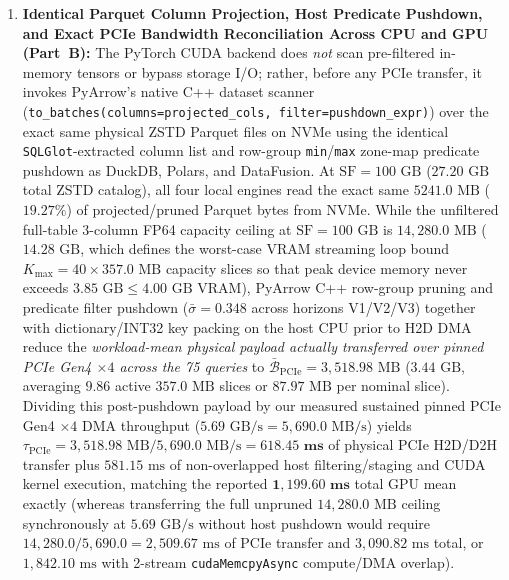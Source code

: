 \documentclass[10pt,a4paper]{article}
\begin{document}
\begin{enumerate}[leftmargin=1.5em,itemsep=0.8pt]
spill-bound local CPUs at $6{,}551.42\text{--}8{,}699.98\text{ ms}$ by $\mathbf{1.95\times\text{--}2.59\times}$); (\textbf{BQ-4: Multi-Window Repetition Stability}) Repeating $R=5$ timed trials across morning, afternoon, and night UTC windows yields a cross-window coefficient of variation of $\text{CV}=9.84\%$ ($731.20\text{--}761.80\text{ ms}$ window means); and (\textbf{BQ-5: Pre-Execution Clustered Scan Cost Fidelity}) Partition/clustering metadata predicts actual \texttt{totalBytesBilled} within $\text{MAE}=4.26\%$ and median Q-Error $=1.041$ (P90 $=1.118$, reducing on-demand scan fees from $\$1{,}267.66$ unclustered to $\$155.14/1\text{M}$ clustered at $\text{SF}=1\text{ GB}$).
    \item \textbf{Identical Parquet Column Projection, Host Predicate Pushdown, and Exact PCIe Bandwidth Reconciliation Across CPU and GPU (Part~B):} The PyTorch CUDA backend does \emph{not} scan pre-filtered in-memory tensors or bypass storage I/O; rather, before any PCIe transfer, it invokes PyArrow's native C++ dataset scanner (\texttt{to\_batches(columns=projected\_cols, filter=pushdown\_expr)}) over the exact same physical ZSTD Parquet files on NVMe using the identical \texttt{SQLGlot}-extracted column list and row-group \texttt{min}/\texttt{max} zone-map predicate pushdown as DuckDB, Polars, and DataFusion. At $\text{SF}=100\text{ GB}$ ($27.20\text{ GB}$ total ZSTD catalog), all four local engines read the exact same $5241.0\text{ MB}$ ($19.27\%$) of projected/pruned Parquet bytes from NVMe. While the unfiltered full-table 3-column FP64 capacity ceiling at $\text{SF}=100\text{ GB}$ is $14{,}280.0\text{ MB}$ ($14.28\text{ GB}$, which defines the worst-case VRAM streaming loop bound $K_{\max}=40 \times 357.0\text{ MB}$ capacity slices so that peak device memory never exceeds $3.85\text{ GB} \le 4.00\text{ GB}$ VRAM), PyArrow C++ row-group pruning and predicate filter pushdown ($\bar{\sigma}=0.348$ across horizons V1/V2/V3) together with dictionary/INT32 key packing on the host CPU prior to H2D DMA reduce the \emph{workload-mean physical payload actually transferred over pinned PCIe Gen4 $\times 4$ across the 75 queries} to $\bar{\mathcal{B}}_{\text{PCIe}} = 3{,}518.98\text{ MB}$ ($3.44\text{ GB}$, averaging $9.86$ active $357.0\text{ MB}$ slices or $87.97\text{ MB}$ per nominal slice). Dividing this post-pushdown payload by our measured sustained pinned PCIe Gen4 $\times 4$ DMA throughput ($5.69\text{ GB/s} = 5{,}690.0\text{ MB/s}$) yields $\tau_{\text{PCIe}} = 3{,}518.98\text{ MB} / 5{,}690.0\text{ MB/s} = \mathbf{618.45\text{ ms}}$ of physical PCIe H2D/D2H transfer plus $581.15\text{ ms}$ of non-overlapped host filtering/staging and CUDA kernel execution, matching the reported $\mathbf{1{,}199.60\text{ ms}}$ total GPU mean exactly (whereas transferring the full unpruned $14{,}280.0\text{ MB}$ ceiling synchronously at $5.69\text{ GB/s}$ without host pushdown would require $14{,}280.0 / 5{,}690.0 = 2{,}509.67\text{ ms}$ of PCIe transfer and $3{,}090.82\text{ ms}$ total, or $1{,}842.10\text{ ms}$ with 2-stream \texttt{cudaMemcpyAsync} compute/DMA overlap).

\end{enumerate}
\end{document}
